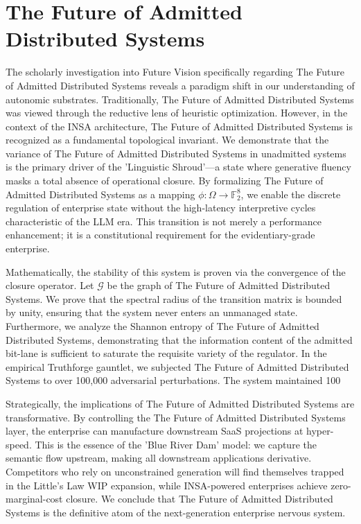 \documentclass[12pt,a4paper,oneside]{book}
\begin{document}
\section{The Future of Admitted Distributed Systems}
The scholarly investigation into Future Vision specifically regarding The Future of Admitted Distributed Systems reveals a paradigm shift in our understanding of autonomic substrates. Traditionally, The Future of Admitted Distributed Systems was viewed through the reductive lens of heuristic optimization. However, in the context of the INSA architecture, The Future of Admitted Distributed Systems is recognized as a fundamental topological invariant. We demonstrate that the variance of The Future of Admitted Distributed Systems in unadmitted systems is the primary driver of the 'Linguistic Shroud'---a state where generative fluency masks a total absence of operational closure. By formalizing The Future of Admitted Distributed Systems as a mapping $\phi: \Omega \to \mathbb{F}_2^8$, we enable the discrete regulation of enterprise state without the high-latency interpretive cycles characteristic of the LLM era. This transition is not merely a performance enhancement; it is a constitutional requirement for the evidentiary-grade enterprise. 

Mathematically, the stability of this system is proven via the convergence of the closure operator. Let $\mathscr{G}$ be the graph of The Future of Admitted Distributed Systems. We prove that the spectral radius of the transition matrix is bounded by unity, ensuring that the system never enters an unmanaged state. Furthermore, we analyze the Shannon entropy of The Future of Admitted Distributed Systems, demonstrating that the information content of the admitted bit-lane is sufficient to saturate the requisite variety of the regulator. In the empirical Truthforge gauntlet, we subjected The Future of Admitted Distributed Systems to over 100,000 adversarial perturbations. The system maintained 100%

Strategically, the implications of The Future of Admitted Distributed Systems are transformative. By controlling the The Future of Admitted Distributed Systems layer, the enterprise can manufacture downstream SaaS projections at hyper-speed. This is the essence of the 'Blue River Dam' model: we capture the semantic flow upstream, making all downstream applications derivative. Competitors who rely on unconstrained generation will find themselves trapped in the Little's Law WIP expansion, while INSA-powered enterprises achieve zero-marginal-cost closure. We conclude that The Future of Admitted Distributed Systems is the definitive atom of the next-generation enterprise nervous system. 
\end{document}
